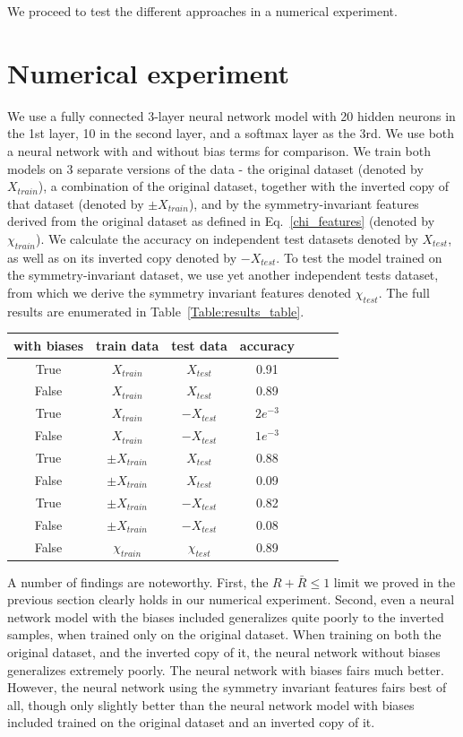 \documentclass[twocolumn, prl, nofootinbib]{revtex4-1}
\begin{document}
We proceed to test the different approaches in a numerical experiment.


\section{Numerical experiment}
\label{Sec:empirics}

We use a fully connected 3-layer neural network model with 20 hidden neurons in the 1st layer, 10 in the second layer, and a softmax layer as the 3rd.
We use both a neural network with and without bias terms for comparison. We train both models on 3 separate  versions of the data - the original dataset (denoted by $X_{train}$), a combination of the original dataset, together with the inverted copy of that dataset (denoted by $\pm X_{train}$), and by the symmetry-invariant features derived from the original dataset as defined in Eq.~\eqref{chi_features} (denoted by $\chi_{train}$). We calculate the accuracy on independent test datasets denoted by $X_{test}$, as well as on its inverted copy denoted by $-X_{test}$. To test the model trained on the symmetry-invariant dataset, we use yet another independent tests dataset, from which we derive the symmetry invariant features denoted $\chi_{test}$. The full results are enumerated in Table~\ref{Table:results_table}.


\begin{tabular}{ccccccc}\label{Table:results_table}
	with biases & train data & test data & accuracy \\ 
	\hline
	True & $X_{train}$ & $X_{test}$ & 0.91 \\
	False & $X_{train}$ & $X_{test}$ & 0.89 \\
	True & $X_{train}$ & $-X_{test}$ & $2e^{-3}$ \\
	False & $X_{train}$ & $-X_{test}$ & $1e^{-3}$ \\
	\hline
	True & $\pm X_{train}$ & $X_{test}$ & 0.88 \\
	False & $\pm X_{train}$ & $X_{test}$ & 0.09 \\
	True & $\pm X_{train}$ & $-X_{test}$ & 0.82 \\
	False & $\pm X_{train}$ & $-X_{test}$ & 0.08 \\
	\hline	
	False & $\chi_{train}$ & $\chi_{test}$ & 0.89 \\
	\hline
\end{tabular} 


A number of findings are noteworthy. First, the $R + \bar{R} \leq 1$ limit we proved in the previous section clearly holds in our numerical experiment. Second, even a neural network model with the biases included generalizes quite poorly to the inverted samples, when trained only on the original dataset. When training on both the original dataset, and the inverted copy of it, the neural network without biases generalizes extremely poorly. The neural network with biases fairs much better. However, the neural network using the symmetry invariant features fairs best of all, though only slightly better than the neural network model with biases included trained on the original dataset and an inverted copy of it.
\end{document}
